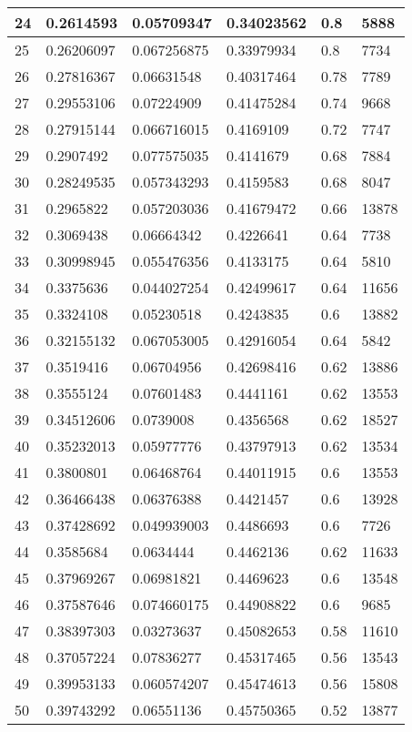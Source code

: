 \begin{longtable}{|l|l|l|l|l|l|}
24 & 0.2614593 & 0.05709347 & 0.34023562 & 0.8 & 5888 \\ \hline 
25 & 0.26206097 & 0.067256875 & 0.33979934 & 0.8 & 7734 \\ \hline 
26 & 0.27816367 & 0.06631548 & 0.40317464 & 0.78 & 7789 \\ \hline 
27 & 0.29553106 & 0.07224909 & 0.41475284 & 0.74 & 9668 \\ \hline 
28 & 0.27915144 & 0.066716015 & 0.4169109 & 0.72 & 7747 \\ \hline 
29 & 0.2907492 & 0.077575035 & 0.4141679 & 0.68 & 7884 \\ \hline 
30 & 0.28249535 & 0.057343293 & 0.4159583 & 0.68 & 8047 \\ \hline 
31 & 0.2965822 & 0.057203036 & 0.41679472 & 0.66 & 13878 \\ \hline 
32 & 0.3069438 & 0.06664342 & 0.4226641 & 0.64 & 7738 \\ \hline 
33 & 0.30998945 & 0.055476356 & 0.4133175 & 0.64 & 5810 \\ \hline 
34 & 0.3375636 & 0.044027254 & 0.42499617 & 0.64 & 11656 \\ \hline 
35 & 0.3324108 & 0.05230518 & 0.4243835 & 0.6 & 13882 \\ \hline 
36 & 0.32155132 & 0.067053005 & 0.42916054 & 0.64 & 5842 \\ \hline 
37 & 0.3519416 & 0.06704956 & 0.42698416 & 0.62 & 13886 \\ \hline 
38 & 0.3555124 & 0.07601483 & 0.4441161 & 0.62 & 13553 \\ \hline 
39 & 0.34512606 & 0.0739008 & 0.4356568 & 0.62 & 18527 \\ \hline 
40 & 0.35232013 & 0.05977776 & 0.43797913 & 0.62 & 13534 \\ \hline 
41 & 0.3800801 & 0.06468764 & 0.44011915 & 0.6 & 13553 \\ \hline 
42 & 0.36466438 & 0.06376388 & 0.4421457 & 0.6 & 13928 \\ \hline 
43 & 0.37428692 & 0.049939003 & 0.4486693 & 0.6 & 7726 \\ \hline 
44 & 0.3585684 & 0.0634444 & 0.4462136 & 0.62 & 11633 \\ \hline 
45 & 0.37969267 & 0.06981821 & 0.4469623 & 0.6 & 13548 \\ \hline 
46 & 0.37587646 & 0.074660175 & 0.44908822 & 0.6 & 9685 \\ \hline 
47 & 0.38397303 & 0.03273637 & 0.45082653 & 0.58 & 11610 \\ \hline 
48 & 0.37057224 & 0.07836277 & 0.45317465 & 0.56 & 13543 \\ \hline 
49 & 0.39953133 & 0.060574207 & 0.45474613 & 0.56 & 15808 \\ \hline 
50 & 0.39743292 & 0.06551136 & 0.45750365 & 0.52 & 13877 \\ \hline 
\end{longtable}